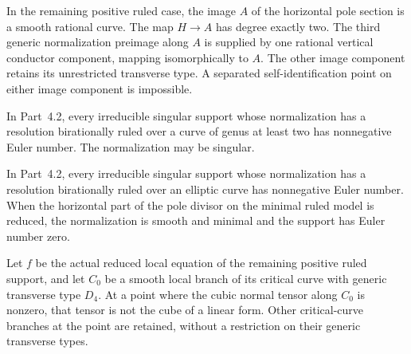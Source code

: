 
\begin{proposition}[P4.55]\hypertarget{tag-02XU}{}\label{night:P4.55}\label{stmt:P4.55}


In the remaining positive ruled case, the image $A$ of the
horizontal pole section is a smooth rational curve. The map
$H\to A$ has degree exactly two. The third generic
normalization preimage along $A$ is supplied by one rational
vertical conductor component, mapping isomorphically to $A$.
The other image component retains its unrestricted transverse
type. A separated self-identification point on either image
component is impossible.
\end{proposition}

\begin{proposition}[P4R.7]\hypertarget{tag-02YJ}{}\label{night:P4R.7}\label{stmt:P4R.7}


In Part~4.2, every irreducible singular
support whose normalization has a
resolution birationally ruled over a
curve of genus at least two has
nonnegative Euler number. The
normalization may be singular.
\end{proposition}

\begin{proposition}[P4R.9]\hypertarget{tag-02YL}{}\label{night:P4R.9}\label{stmt:P4R.9}


In Part~4.2, every irreducible singular
support whose normalization has a
resolution birationally ruled over an
elliptic curve has nonnegative Euler
number. When the horizontal part of
the pole divisor on the minimal ruled
model is reduced, the normalization
is smooth and minimal and the support
has Euler number zero.
\end{proposition}

\begin{proposition}[P4R.19]\hypertarget{tag-02YC}{}\label{night:P4R.19}\label{stmt:P4R.19}


Let $f$ be the actual reduced local equation of the remaining
positive ruled support, and let $C_0$ be a smooth local branch
of its critical curve with generic transverse type $D_4$.
At a point where the cubic normal tensor along $C_0$ is
nonzero, that tensor is not the cube of a linear form.
Other critical-curve branches at the point are retained,
without a restriction on their generic transverse types.
\end{proposition}

